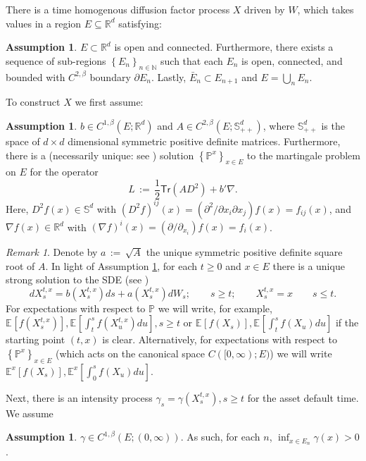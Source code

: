\documentclass[11pt, letterpaper]{amsart}
\theoremstyle{definition}
\newtheorem{assumption}[theorem]{Assumption}
\theoremstyle{remark}
\newtheorem{remark}[theorem]{Remark}
\numberwithin{equation}{section}
\newcommand{\reals}{\mathbb R}
\newcommand{\nats}{\mathbb N}
\newcommand{\prob}{\mathbb{P}}
\newcommand{\esp}{\mathbb{E}}
\newcommand{\espalt}[2]{\esp^{#1}\bra{#2}}
\newcommand{\dfn}{\, := \,}
\newcommand{\bra}[1]{\left[#1\right]}
\newcommand{\cbra}[1]{\left\{#1\right\}}
\newcommand{\tr}{\mathsf{Tr}}
\begin{document}
There is a time homogenous diffusion factor process $X$ driven by $W$, which takes values in a region $E\subseteq\reals^d$ satisfying:
\begin{assumption}\label{A:region} $E\subset\reals^d$ is open and connected.  Furthermore, there exists a sequence of sub-regions $\cbra{E_n}_{n\in\nats}$ such that each $E_n$ is open, connected, and bounded with $C^{2,\beta}$ boundary $\partial E_n$. Lastly, $\bar{E}_n\subset E_{n+1}$ and $E = \bigcup_n E_n$.
\end{assumption}
To construct $X$ we first assume:
\begin{assumption}\label{A:factor}
$b \in C^{1,\beta}\left(E; \reals^d\right)$ and $A \in C^{2,\beta}\left(E;\mathbb{S}^d_{++}\right)$, where $\mathbb{S}^d_{++}$ is the space of $d\times d$ dimensional symmetric positive definite matrices.  Furthermore, there is a (necessarily unique: see \cite[Chapter 6]{MR2190038}) solution $\cbra{\prob^x}_{x\in E}$ to the martingale problem on $E$ for the operator
\begin{equation}\label{E:L_def}
L \dfn \frac{1}{2}\tr\left(AD^2\right) + b'\nabla.
\end{equation}
Here, $D^2f(x)\in\mathbb{S}^d$ with $(D^2f)^{ij}(x) = (\partial^2/\partial x_i\partial x_j) f(x) = f_{ij}(x)$, and $\nabla f(x) \in \reals^d$ with $(\nabla f)^{i}(x) = (\partial/\partial_{x_i})f(x) = f_i(x)$.
\end{assumption}

\begin{remark}\label{R:mart_prob} Denote by $a\dfn\sqrt{A}$ the unique symmetric positive definite square root of $A$. In light of Assumption \ref{A:factor}, for each $t\geq 0$ and $x\in E$ there is a unique strong solution to the SDE (see \cite[Chapter IX]{MR1725357})
\begin{equation*}
dX^{t,x}_s = b(X^{t,x}_s)ds + a(X^{t,x}_s)dW_s;\qquad s\geq t;\qquad X^{t,x}_s = x\qquad s\leq t.
\end{equation*}
For expectations with respect to $\prob$ we will write, for example, $\espalt{}{f(X^{t,x}_s)}, \espalt{}{\int_t^s f(X^{t,x}_u)du}, s\geq t$ or $\espalt{}{f(X_s)}, \espalt{}{\int_t^s f(X_u)du}$ if the starting point $(t,x)$ is clear.  Alternatively, for expectations with respect to $\cbra{\prob^x}_{x\in E}$ (which acts on the canonical space $C([0,\infty);E)$) we will write $\espalt{x}{f(X_s)}, \espalt{x}{\int_0^s f(X_u)du}$.
\end{remark}

Next, there is an intensity process $\gamma_s = \gamma(X^{t,x}_s), s\geq t$ for the asset default time.  We assume
\begin{assumption}\label{A:intensity}
$\gamma\in C^{1,\beta}\left(E;(0,\infty)\right)$. As such, for each $n$, $\inf_{x\in E_n}\gamma(x) > 0$.
\end{assumption}
\end{document}

